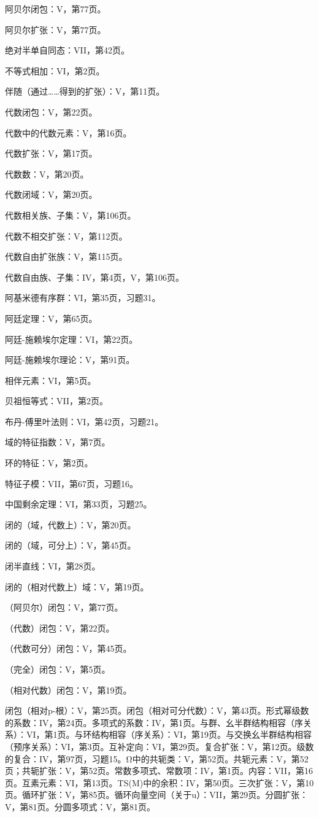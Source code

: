 
阿贝尔闭包：V，第77页。

阿贝尔扩张：V，第77页。

绝对半单自同态：VII，第42页。

不等式相加：VI，第2页。

伴随（通过……得到的扩张）：V，第11页。

代数闭包：V，第22页。

代数中的代数元素：V，第16页。

代数扩张：V，第17页。

代数数：V，第20页。

代数闭域：V，第20页。

代数相关族、子集：V，第106页。

代数不相交扩张：V，第112页。

代数自由扩张族：V，第115页。

代数自由族、子集：IV，第4页，V，第106页。

阿基米德有序群：VI，第35页，习题31。

阿廷定理：V，第65页。

阿廷-施赖埃尔定理：VI，第22页。

阿廷-施赖埃尔理论：V，第91页。

相伴元素：VI，第5页。

贝祖恒等式：VII，第2页。

布丹-傅里叶法则：VI，第42页，习题21。

域的特征指数：V，第7页。

环的特征：V，第2页。

特征子模：VII，第67页，习题16。

中国剩余定理：VI，第33页，习题25。

闭的（域，代数上）：V，第20页。

闭的（域，可分上）：V，第45页。

闭半直线：VI，第28页。

闭的（相对代数上）域：V，第19页。

（阿贝尔）闭包：V，第77页。

（代数）闭包：V，第22页。

（代数可分）闭包：V，第45页。

（完全）闭包：V，第5页。

（相对代数）闭包：V，第19页。

闭包（相对p-根）：V，第25页。闭包（相对可分代数）：V，第43页。形式幂级数的系数：IV，第24页。多项式的系数：IV，第1页。与群、幺半群结构相容（序关系）：VI，第1页。与环结构相容（序关系）：VI，第19页。与交换幺半群结构相容（预序关系）：VI，第3页。互补定向：VI，第29页。复合扩张：V，第12页。级数的复合：IV，第97页，习题15。Ω中的共轭类：V，第52页。共轭元素：V，第52页；共轭扩张：V，第52页。常数多项式、常数项：IV，第1页。内容：VII，第16页。互素元素：VI，第13页。TS(M)中的余积：IV，第50页。三次扩张：V，第10页。循环扩张：V，第85页。循环向量空间（关于u）：VII，第29页。分圆扩张：V，第81页。分圆多项式：V，第81页。

